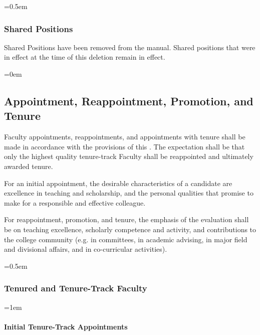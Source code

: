 \documentclass{manual}
\let\oldsubsection\subsection
\renewcommand\subsection{\leftskip=0em\oldsubsection}
\let\oldsubsubsection\subsubsection
\renewcommand\subsubsection{\leftskip=0.5em\oldsubsubsection}
\let\oldparagraph\paragraph
\renewcommand\paragraph{\leftskip=1em\oldparagraph}
\begin{document}
\subsubsection{Shared Positions}
Shared Positions have been removed from the manual. Shared positions that were in effect at the time of this deletion remain in effect.

\subsection{Appointment, Reappointment, Promotion, and Tenure}\label{sec:AppointmentReappointmentPromotionAndTenure}
Faculty appointments, reappointments, and appointments with tenure shall be made in accordance with the provisions of this . The expectation shall be that only the highest quality tenure-track Faculty shall be reappointed and ultimately awarded tenure.

For an initial appointment, the desirable characteristics of a candidate are excellence in teaching and scholarship, and the personal qualities that promise to make for a responsible and effective colleague.

For reappointment, promotion, and tenure, the emphasis of the evaluation shall be on teaching excellence, scholarly competence and activity, and contributions to the college community (e.g. in committees, in academic advising, in major field and divisional affairs, and in co-curricular activities).

\subsubsection{Tenured and Tenure-Track Faculty}\label{sub:TenuredAndTenureTrackFaculty}

\paragraph{Initial Tenure-Track Appointments}\label{par:InitialTenureTrackAppointments}
\end{document}
